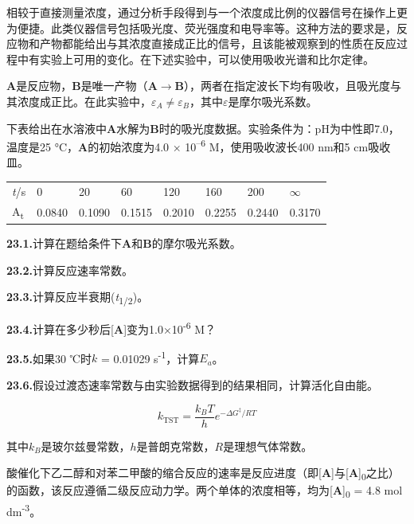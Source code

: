 相较于直接测量浓度，通过分析手段得到与一个浓度成比例的仪器信号在操作上更为便捷。此类仪器信号包括吸光度、荧光强度和电导率等。这种方法的要求是，反应物和产物都能给出与其浓度直接成正比的信号，且该能被观察到的性质在反应过程中有实验上可用的变化。在下述实验中，可以使用吸收光谱和比尔定律。

\textbf{A}是反应物，\textbf{B}是唯一产物（\textbf{A}$\rightarrow$\textbf{B}），两者在指定波长下均有吸收，且吸光度与其浓度成正比。在此实验中，$\varepsilon_A\neq\varepsilon_B$，其中$\varepsilon$是摩尔吸光系数。

下表给出在水溶液中\textbf{A}水解为\textbf{B}时的吸光度数据。实验条件为：pH为中性即7.0，温度是25 °C，\textbf{A}的初始浓度为4.0 × 10\textsuperscript{--6} M，使用吸收波长400 nm和5 cm吸收皿。

\begin{longtable}[]{@{}llllllll@{}}
	\toprule
	\emph{t}/s &0&20&60&120&160&200&$\infty$ \tabularnewline
	A\textsubscript{t} & 0.0840&0.1090&0.1515&0.2010&0.2255&0.2440&0.3170\tabularnewline
	\bottomrule
\end{longtable}

\noindent\textbf{23.1.}计算在题给条件下\textbf{A}和\textbf{B}的摩尔吸光系数。

\noindent\textbf{23.2.}计算反应速率常数。

\noindent\textbf{23.3.}计算反应半衰期(\emph{t}\textsubscript{1/2})。

\noindent\textbf{23.4.}计算在多少秒后{[}\textbf{A}{]}变为1.0×10\textsuperscript{-6}
M？

\noindent\textbf{23.5.}如果30 ℃时$k$ = 0.01029 s\textsuperscript{-1}，计算$E_a$。

\noindent\textbf{23.6.}假设过渡态速率常数与由实验数据得到的结果相同，计算活化自由能。

$$
k_{\mathrm{TST}} =\frac{k_BT}{h}e^{-\Delta G^\ddag/RT}
$$

\noindent 其中$k_B$是玻尔兹曼常数，$h$是普朗克常数，$R$是理想气体常数。

酸催化下乙二醇和对苯二甲酸的缩合反应的速率是反应进度（即{[}\textbf{A}{]}与{[}\textbf{A}{]}\textsubscript{0}之比）的函数，该反应遵循二级反应动力学。两个单体的浓度相等，均为{[}\textbf{A}{]}\textsubscript{0} = 4.8 mol dm\textsuperscript{-3}。

